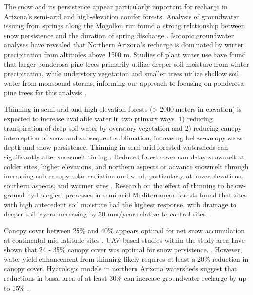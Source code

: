 \documentclass[
  number,
  preprint,
  3p,
  onecolumn]{elsarticle}
\begin{document}
The snow and its persistence appear particularly important for recharge
in Arizona's semi-arid and high-elevation conifer forests. Analysis of
groundwater issuing from springs along the Mogollon rim found a strong
relationship between snow persistence and the duration of spring
discharge \citep{donovan2022}. Isotopic groundwater analyses have
revealed that Northern Arizona's recharge is dominated by winter
precipitation from altitudes above 1500
m\citep{eastoe2007, eastoe2023, earman2006, blasch2006}. Studies of
plant water use have found that larger ponderosa pine trees primarily
utilize deeper soil moisture from winter precipitation, while understory
vegetation and smaller trees utilize shallow soil water from monsoonal
storms, informing our approach to focusing on ponderosa pine trees for
this analysis \citep{kerhoulas2013, kerhoulas2023}.

Thinning in semi-arid and high-elevation forests (\textgreater{} 2000
meters in elevation) is expected to increase available water in two
primary ways. 1) reducing transpiration of deep soil water by overstory
vegetation and 2) reducing canopy interception of snow and subsequent
sublimation, increasing below-canopy snow depth and snow persistence.
Thinning in semi-arid forested watersheds can significantly alter
snowmelt timing \citep{dwivedi2024}. Reduced forest cover can delay
snowmelt at colder sites, higher elevations, and northern aspects or
advance snowmelt through increasing sub-canopy solar radiation and wind,
particularly at lower elevations, southern aspects, and warmer sites
\citep{biederman_recent_2015, dwivedi2024}. Research on the effect of
thinning to below-ground hydrological processes in semi-arid
Mediterranean forests found that sites with high antecedent soil
moisture had the highest response, with drainage to deeper soil layers
increasing by 50 mm/year relative to control
sites\citep{del_campo_effectiveness_2019}.

Canopy cover between 25\% and 40\% appears optimal for net snow
accumulation at continental mid-latitude sites \citep{veatch2009}.
UAV-based studies within the study area have shown that 24 - 35\% canopy
cover was optimal for snow persistence.
\citep{donager2021, sankey_multi-scale_2015, belmonte_uav-based_2021}.
However, water yield enhancement from thinning likely requires at least
a 20\% reduction in canopy cover\citep{adams_ecohydrological_2012}.
Hydrologic models in northern Arizona watersheds suggest that reductions
in basal area of at least 30\% can increase groundwater recharge by up
to 15\% \citep{wyatt2015}.
\end{document}
